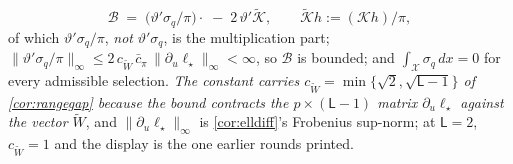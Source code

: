 \begin{lemma}
\begin{enumerate}
\begin{equation}\label{eq:Bpi}
\mathcal B\;=\;\big(\vartheta'\sigma_q/\pi\big)\cdot{}\;-\;2\,\vartheta'\tilde{\mathcal K},
\qquad \tilde{\mathcal K}h:=(\mathcal Kh)/\pi ,
\end{equation}
of which $\vartheta'\sigma_q/\pi$, \emph{not} $\vartheta'\sigma_q$, is the multiplication part;
$\|\vartheta'\sigma_q/\pi\|_\infty\le2\,c_{\widetilde W}\,\bar c_\pi\,\|\partial_u\ell_\star\|_\infty<\infty$, so
$\mathcal B$ is bounded; and $\int_{\mathcal X}\sigma_q\,dx=0$ for every admissible selection.
\emph{The constant carries $c_{\widetilde W}=\min\{\sqrt2,\sqrt{\mathsf L-1}\}$ of
\cref{cor:rangegap} because the bound contracts the $p\times(\mathsf L-1)$ matrix
$\partial_u\ell_\star$ against the vector $\widetilde W$}, and $\|\partial_u\ell_\star\|_\infty$ is
\cref{cor:elldiff}'s Frobenius sup-norm; at $\mathsf L=2$, $c_{\widetilde W}=1$ and the
display is the one earlier rounds printed.
\end{enumerate}
\end{lemma}


